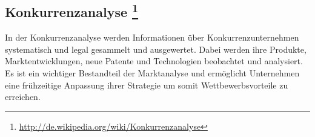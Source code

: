 \subsection[Konkurrenzanalyse]{Konkurrenzanalyse \footnote{\url{http://de.wikipedia.org/wiki/Konkurrenzanalyse}}}
In der Konkurrenzanalyse werden Informationen über Konkurrenzunternehmen systematisch und legal gesammelt und ausgewertet. Dabei werden ihre Produkte, Marktentwicklungen, neue Patente und Technologien beobachtet und analysiert. Es ist ein wichtiger Bestandteil der Marktanalyse und ermöglicht Unternehmen eine frühzeitige Anpassung ihrer Strategie um somit Wettbewerbsvorteile zu erreichen.